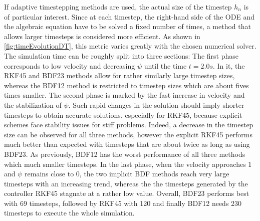 If adaptive timestepping methods are used, the actual size of the timestep $h_n$ is of particular interest. Since at each timestep, the right-hand side of the ODE and the algebraic equation have to be solved a fixed number of times, a method that allows larger timesteps is considered more efficient. As shown in \autoref{fig:timeEvolutionDT}, this metric varies greatly with the chosen numerical solver. The simulation time can be roughly split into three sections: The first phase corresponds to low velocity and decreasing $\psi$ until the time $t=2.0s$. In it, the RKF45 and BDF23 methods allow for rather similarly large timestep sizes, whereas the BDF12 method is restricted to timestep sizes which are about fives times smaller. The second phase is marked by the fast increase in velocity and the stabilization of $\psi$. Such rapid changes in the solution should imply shorter timesteps to obtain accurate solutions, especially for RKF45, because explicit schemes face stability issues for stiff problems. Indeed, a decrease in the timestep size can be observed for all three methods, however the explicit RKF45 performs much better than expected with timesteps that are about twice as long as using BDF23. As previously, BDF12 has the worst performance of all three methods which much smaller timesteps. In the last phase, when the velocity approaches 1 and $\psi$ remains close to 0, the two implicit BDF methods reach very large timesteps with an increasing trend, whereas the the timesteps generated by the controller RKF45 stagnate at a rather low value. Overall, BDF23 performs best with 69 timesteps, followed by RKF45 with 120 and finally BDF12 needs 230 timesteps to execute the whole simulation. 

